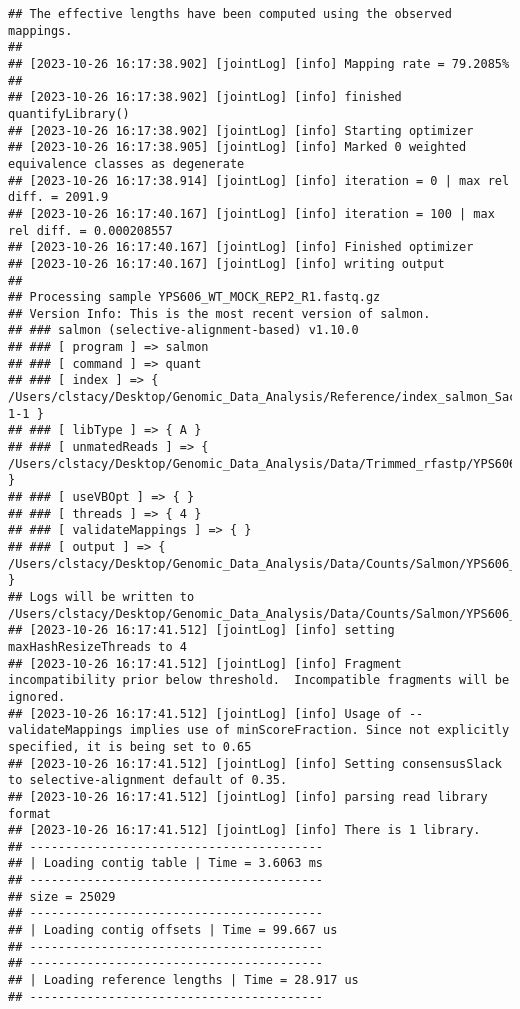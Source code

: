 \documentclass[
]{book}
\begin{document}
\begin{verbatim}
## The effective lengths have been computed using the observed mappings.
## 
## [2023-10-26 16:17:38.902] [jointLog] [info] Mapping rate = 79.2085%
## 
## [2023-10-26 16:17:38.902] [jointLog] [info] finished quantifyLibrary()
## [2023-10-26 16:17:38.902] [jointLog] [info] Starting optimizer
## [2023-10-26 16:17:38.905] [jointLog] [info] Marked 0 weighted equivalence classes as degenerate
## [2023-10-26 16:17:38.914] [jointLog] [info] iteration = 0 | max rel diff. = 2091.9
## [2023-10-26 16:17:40.167] [jointLog] [info] iteration = 100 | max rel diff. = 0.000208557
## [2023-10-26 16:17:40.167] [jointLog] [info] Finished optimizer
## [2023-10-26 16:17:40.167] [jointLog] [info] writing output 
## 
## Processing sample YPS606_WT_MOCK_REP2_R1.fastq.gz
## Version Info: This is the most recent version of salmon.
## ### salmon (selective-alignment-based) v1.10.0
## ### [ program ] => salmon 
## ### [ command ] => quant 
## ### [ index ] => { /Users/clstacy/Desktop/Genomic_Data_Analysis/Reference/index_salmon_Saccharomyces_cerevisiae.R64-1-1 }
## ### [ libType ] => { A }
## ### [ unmatedReads ] => { /Users/clstacy/Desktop/Genomic_Data_Analysis/Data/Trimmed_rfastp/YPS606_WT_MOCK_REP2_R1.fastq.gz }
## ### [ useVBOpt ] => { }
## ### [ threads ] => { 4 }
## ### [ validateMappings ] => { }
## ### [ output ] => { /Users/clstacy/Desktop/Genomic_Data_Analysis/Data/Counts/Salmon/YPS606_WT_MOCK_REP2_R1.fastq.gz_quant }
## Logs will be written to /Users/clstacy/Desktop/Genomic_Data_Analysis/Data/Counts/Salmon/YPS606_WT_MOCK_REP2_R1.fastq.gz_quant/logs
## [2023-10-26 16:17:41.512] [jointLog] [info] setting maxHashResizeThreads to 4
## [2023-10-26 16:17:41.512] [jointLog] [info] Fragment incompatibility prior below threshold.  Incompatible fragments will be ignored.
## [2023-10-26 16:17:41.512] [jointLog] [info] Usage of --validateMappings implies use of minScoreFraction. Since not explicitly specified, it is being set to 0.65
## [2023-10-26 16:17:41.512] [jointLog] [info] Setting consensusSlack to selective-alignment default of 0.35.
## [2023-10-26 16:17:41.512] [jointLog] [info] parsing read library format
## [2023-10-26 16:17:41.512] [jointLog] [info] There is 1 library.
## -----------------------------------------
## | Loading contig table | Time = 3.6063 ms
## -----------------------------------------
## size = 25029
## -----------------------------------------
## | Loading contig offsets | Time = 99.667 us
## -----------------------------------------
## -----------------------------------------
## | Loading reference lengths | Time = 28.917 us
## -----------------------------------------

\end{verbatim}
\end{document}
